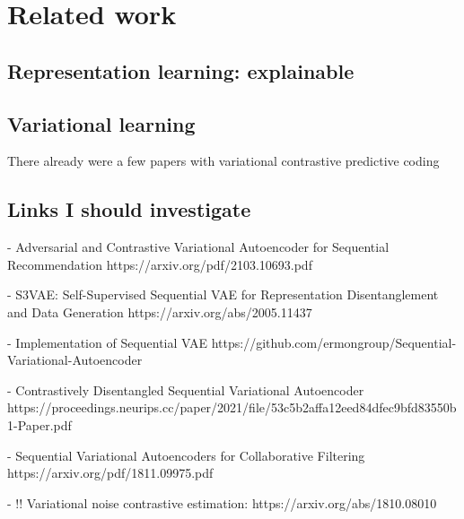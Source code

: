 
\chapter{Related work}
\section{Representation learning: explainable}
\section{Variational learning}
There already were a few papers with variational contrastive predictive coding

\section{Links I should investigate}

- Adversarial and Contrastive Variational Autoencoder for Sequential Recommendation
https://arxiv.org/pdf/2103.10693.pdf

- S3VAE: Self-Supervised Sequential VAE for Representation Disentanglement and Data Generation
https://arxiv.org/abs/2005.11437

- Implementation of Sequential VAE
https://github.com/ermongroup/Sequential-Variational-Autoencoder

- Contrastively Disentangled Sequential Variational Autoencoder
https://proceedings.neurips.cc/paper/2021/file/53c5b2affa12eed84dfec9bfd83550b1-Paper.pdf

- Sequential Variational Autoencoders for Collaborative Filtering
https://arxiv.org/pdf/1811.09975.pdf

- !! Variational noise contrastive estimation:
https://arxiv.org/abs/1810.08010